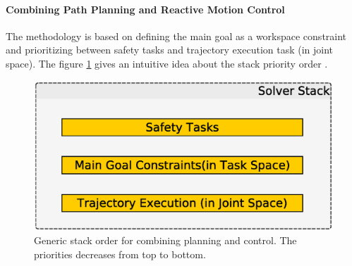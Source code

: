 

\paragraph{Combining Path Planning and Reactive Motion Control}
The methodology is based on defining the main goal as a workspace constraint and prioritizing between safety tasks and trajectory execution task (in joint space). The figure \ref{gso} gives an intuitive idea about the stack priority order .
   \begin{figure}[thpb]
      \centering
      \includegraphics[scale=0.5]{doa/images/ProposedMethodology.eps}
      \caption{Generic stack order for combining planning and control. The priorities decreases from top to bottom. }
      \label{gso}
   \end{figure}

